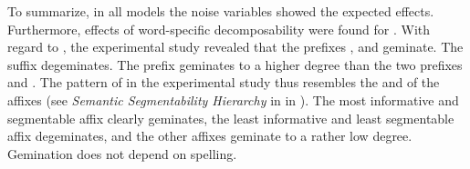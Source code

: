 To summarize, in all models the noise variables showed the expected effects. Furthermore, effects of {word-specific decomposability} were found for . 
With regard to , the experimental study revealed that the prefixes ,  and  geminate. The suffix  degeminates. 
The prefix  geminates to a higher degree than the two prefixes and . The pattern of  in the experimental study thus resembles the  and  of the affixes (see \textit{Semantic Segmentability Hierarchy} in  in ). The most informative and segmentable affix  clearly geminates, the least informative and least segmentable affix  degeminates, and the other affixes geminate to a rather low degree. Gemination does not depend on spelling. 

